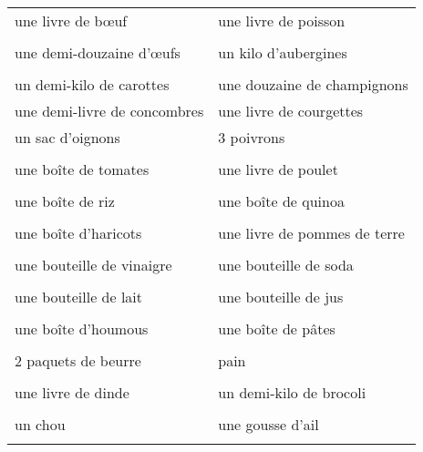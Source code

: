 \documentclass{article}
\date{}
\begin{document}
  \centering
  \noindent
  {\LARGE
    \begin{tabular}{| p{} | p{} |}
      \hline
      une livre de bœuf            & une livre de poisson \\
      & \\
      \hline
      une demi-douzaine d'œufs     & un kilo d'aubergines \\
      & \\
      \hline
      un demi-kilo de carottes     & une douzaine de champignons \\
      \hline
      une demi-livre de concombres & une livre de courgettes \\
      \hline
      un sac d'oignons             & 3 poivrons \\
      & \\
      \hline
      une boîte de tomates         & une livre de poulet \\
      & \\
      \hline
      une boîte de riz             & une boîte de quinoa \\
      & \\
      \hline
      une boîte d'haricots         & une livre de pommes de terre \\
      & \\
      \hline
      une bouteille de vinaigre    & une bouteille de soda \\
      & \\
      \hline
      une bouteille de lait        & une bouteille de jus \\
      & \\
      \hline
      une boîte d'houmous          & une boîte de pâtes \\
      & \\
      \hline
      2 paquets de beurre          & pain \\
      & \\
      \hline
      une livre de dinde           & un demi-kilo de brocoli \\
      & \\
      \hline
      un chou                      & une gousse d'ail \\
      & \\
      \hline
    \end{tabular}
  }
\end{document}
